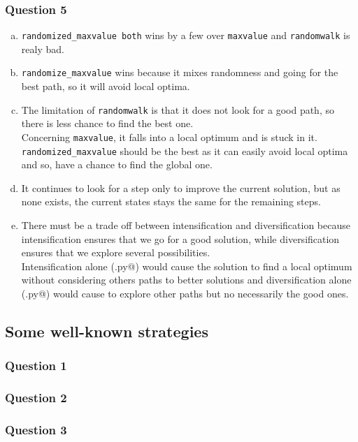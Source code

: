 \documentclass[a4paper,10pt]{article}
\begin{document}
\subsubsection{Question 5}
	\begin{enumerate}[(a)]
		\item \texttt{randomized\_maxvalue both} wins by a few over \texttt{maxvalue} and \texttt{randomwalk} is realy bad.
		\item \texttt{randomize\_maxvalue} wins because it mixes randomness and going for the best path, so it will avoid local optima.
		\item The limitation of \texttt{randomwalk} is that it does not look for a good path, so there is less chance to find the best one.\\
		Concerning \texttt{maxvalue}, it falls into a local optimum and is stuck in it.
		\texttt{randomized\_maxvalue} should be the best as it can easily avoid local optima and so, have a chance to find the global one.
		\item It continues to look for a step only to improve the current solution, but as none exists, the current states stays the same for the remaining steps.
		\item There must be a trade off between intensification and diversification because intensification ensures that we go for a good solution, while diversification ensures that we explore several possibilities. \\
		Intensification alone (\verb@maxvalue.py@) would cause the solution to find a local optimum without considering others paths to better solutions and diversification alone (\verb@randomwalk.py@) would cause to explore other paths but no necessarily the good ones.
	\end{enumerate}

\subsection{Some well-known strategies}
\subsubsection{Question 1}
\subsubsection{Question 2}
\subsubsection{Question 3}
\end{document}
